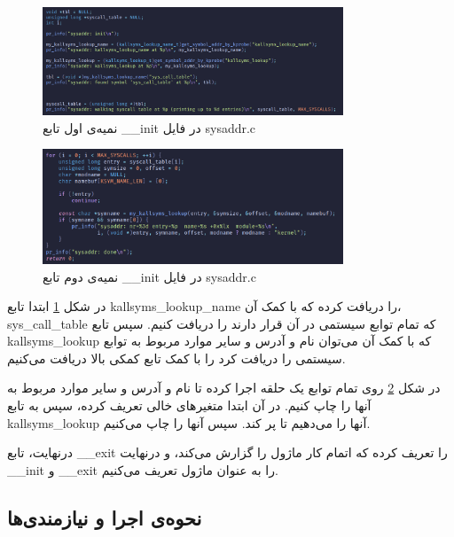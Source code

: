 \documentclass[12pt]{article}
\begin{document}
        \begin{figure}[H]
		\centering
		\includegraphics[width=0.8\textwidth]{report8-resources/2.png}
		\caption{نمیه‌ی اول تابع \textenglish{\_\_init} در فایل \textenglish{sysaddr.c}}
            \label{im2}
	\end{figure}

        \begin{figure}[H]
		\centering
		\includegraphics[width=0.8\textwidth]{report8-resources/3.png}
		\caption{نمیه‌ی دوم تابع \textenglish{\_\_init} در فایل \textenglish{sysaddr.c}}
            \label{im3}
	\end{figure}

        در شکل
        \ref{im2}
        ابتدا تابع
        \textenglish{kallsyms\_lookup\_name}
        را دریافت کرده که با کمک آن،
        \textenglish{sys\_call\_table}
        که تمام توابع سیستمی در آن قرار دارند را دریافت کنیم. سپس تابع
        \textenglish{kallsyms\_lookup}
        که با کمک آن می‌توان نام و آدرس و سایر موارد مربوط به توابع 
        سیستمی را دریافت کرد را با کمک تابع کمکی بالا دریافت می‌کنیم.

        در شکل
        \ref{im3}
        روی تمام توابع یک حلقه اجرا کرده تا نام و آدرس و سایر موارد مربوط به آنها را چاپ کنیم. در آن ابتدا متغیرهای خالی تعریف کرده، سپس به تابع
        \textenglish{kallsyms\_lookup}
        آنها را می‌دهیم تا پر کند. سپس آنها را چاپ می‌کنیم.

        درنهایت، تابع
        \textenglish{\_\_exit}
        را تعریف کرده که اتمام کار ماژول را گزارش می‌کند، و درنهایت
        \textenglish{\_\_init}
        و 
        \textenglish{\_\_exit}
        را به عنوان ماژول تعریف می‌کنیم.

        \subsection{نحوه‌ی اجرا و نیازمندی‌ها}
\end{document}
